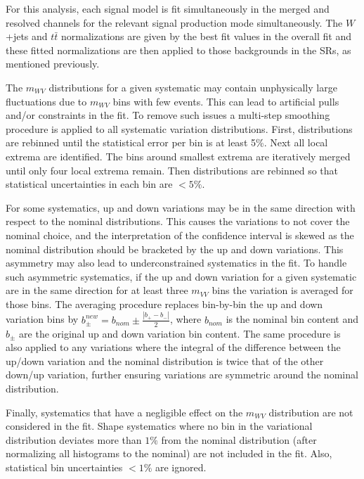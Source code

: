 For this analysis, each signal model is fit simultaneously in the merged and resolved channels for the relevant signal production mode simultaneously. The $W$+jets and $t\bar{t}$ normalizations are given by the best fit values in the overall fit and these fitted normalizations are then applied to those backgrounds in the SRs, as mentioned previously.

The $m_{WV}$ distributions for a given systematic may contain unphysically large fluctuations due to $m_{WV}$ bins with few events. This can lead to artificial pulls and/or constraints in the fit. To remove such issues a multi-step smoothing procedure is applied to all systematic variation distributions. First, distributions are rebinned until the statistical error per bin is at least 5\%. Next all local extrema are identified. The bins around smallest extrema are iteratively merged until only four local extrema remain. Then distributions are rebinned so that statistical uncertainties in each bin are $< 5\%$.

For some systematics, up and down variations may be in the same direction with respect to the nominal distributions. This causes the variations to not cover the nominal choice, and the interpretation of the confidence interval is skewed as the nominal distribution should be bracketed by the up and down variations. This asymmetry may also lead to underconstrained systematics in the fit. To handle such asymmetric systematics, if the up and down variation for a given systematic are in the same direction for at least three $m_{VV}$ bins the variation is averaged for those bins. The averaging procedure replaces bin-by-bin the up and down variation bins by $b_{\pm}^{new}=b_{nom}\pm\frac{|b_{+}-b_{-}|}{2}$, where $b_{nom}$ is the nominal bin content and $b_{\pm}$ are the original up and down variation bin content. The same procedure is also applied to any variations where the integral of the difference between the up/down variation and the nominal distribution is twice that of the other down/up variation, further ensuring variations are symmetric around the nominal distribution.

Finally, systematics that have a negligible effect on the $m_{WV}$ distribution are not considered in the fit. Shape systematics where no bin in the variational distribution deviates more than $1\%$ from the nominal distribution (after normalizing all histograms to the nominal) are not included in the fit. Also, statistical bin uncertainties $< 1\%$ are ignored. 



